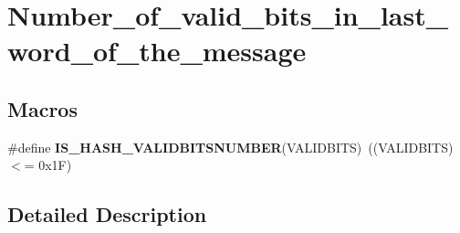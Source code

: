 \hypertarget{group___number__of__valid__bits__in__last__word__of__the__message}{\section{Number\-\_\-of\-\_\-valid\-\_\-bits\-\_\-in\-\_\-last\-\_\-word\-\_\-of\-\_\-the\-\_\-message}
\label{group___number__of__valid__bits__in__last__word__of__the__message}
}
\subsection*{Macros}
\begin{DoxyCompactItemize}
\item 
\hypertarget{group___number__of__valid__bits__in__last__word__of__the__message_gafd2b91c276bd9174867b2b33b4a08c8c}{\#define {\bfseries I\-S\-\_\-\-H\-A\-S\-H\-\_\-\-V\-A\-L\-I\-D\-B\-I\-T\-S\-N\-U\-M\-B\-E\-R}(V\-A\-L\-I\-D\-B\-I\-T\-S)~((V\-A\-L\-I\-D\-B\-I\-T\-S) $<$= 0x1\-F)}\label{group___number__of__valid__bits__in__last__word__of__the__message_gafd2b91c276bd9174867b2b33b4a08c8c}

\end{DoxyCompactItemize}


\subsection{Detailed Description}
